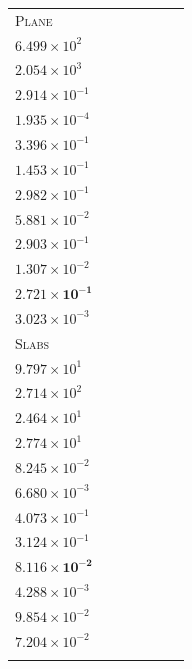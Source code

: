 \begin{table}[p]
{\begin{tabular}{lcccccc}
\rowcolor{black!6}
\textsc{Plane} & \shortstack{$2.912\!\times\!10^{-1}$\\$6.499\!\times\!10^{2}$\\$2.054\!\times\!10^{3}$} & \shortstack{$2.914\!\times\!10^{-1}$\\$2.914\!\times\!10^{-1}$\\$1.935\!\times\!10^{-4}$} & \shortstack{$2.992\!\times\!10^{-1}$\\$3.396\!\times\!10^{-1}$\\$1.453\!\times\!10^{-1}$} & \shortstack{$2.810\!\times\!10^{-1}$\\$2.982\!\times\!10^{-1}$\\$5.881\!\times\!10^{-2}$} & \shortstack{$2.896\!\times\!10^{-1}$\\$2.903\!\times\!10^{-1}$\\$1.307\!\times\!10^{-2}$} & \shortstack{$\mathbf{2.728\!\times\!10^{-1}}$\\$\mathbf{2.721\!\times\!10^{-1}}$\\$3.023\!\times\!10^{-3}$} \\
\textsc{Slabs} & \shortstack{$1.112\!\times\!10^{-1}$\\$9.797\!\times\!10^{1}$\\$2.714\!\times\!10^{2}$} & \shortstack{$2.340\!\times\!10^{1}$\\$2.464\!\times\!10^{1}$\\$2.774\!\times\!10^{1}$} & \shortstack{$8.095\!\times\!10^{-2}$\\$8.245\!\times\!10^{-2}$\\$6.680\!\times\!10^{-3}$} & \shortstack{$2.823\!\times\!10^{-1}$\\$4.073\!\times\!10^{-1}$\\$3.124\!\times\!10^{-1}$} & \shortstack{$7.957\!\times\!10^{-2}$\\$\mathbf{8.116\!\times\!10^{-2}}$\\$4.288\!\times\!10^{-3}$} & \shortstack{$\mathbf{6.479\!\times\!10^{-2}}$\\$9.854\!\times\!10^{-2}$\\$7.204\!\times\!10^{-2}$} \\
\rowcolor{black!6}

\end{tabular}}
\end{table}
